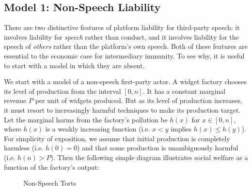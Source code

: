 

\subsection{Model 1: Non-Speech Liability}

There are two distinctive features of platform liability for third-party speech: it involves liability for \emph{speech} rather than conduct, and it involves liability for the speech of \emph{others} rather than the platform's own speech. Both of these features are essential to the economic case for intermediary immunity. To see why, it is useful to start with a model in which they are absent.

We start with a model of a non-speech first-party actor. A widget factory chooses its level of production from the interval $[0,n]$. It has a constant marginal revenue $P$ per unit of widgets produced. But as its level of production increases, it must resort to increasingly harmful techniques to make its production target. Let the marginal harms from the factory's pollution be $h(x)$ for $x \in [0,n]$, where $h(x)$ is a weakly increasing function (i.e. $x < y$ implies $h(x) \le h(y)$). For simplicity of exposition, we assume that initial production is completely harmless (i.e. $h(0) =0$) and that some production is unambiguously harmful (i.e. $h(n) > P$). Then the following simple diagram illustrates social welfare as a function of the factory's output:
\begin{figure}[h]
    \centering
{}
    \caption{Non-Speech Torts}
    \label{fig:nonspeech}
\end{figure}
